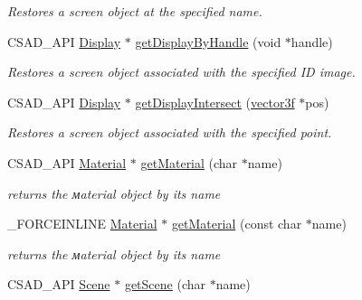 \begin{DoxyCompactItemize}
\begin{DoxyCompactList}\small\item\em Restores a screen object at the specified name. \end{DoxyCompactList}\item 
\hypertarget{classcsad_1_1_graph_a9b483cf1f8583362b672813375527e10}{C\-S\-A\-D\-\_\-\-A\-P\-I \hyperlink{classcsad_1_1_display}{Display} $\ast$ \hyperlink{classcsad_1_1_graph_a9b483cf1f8583362b672813375527e10}{get\-Display\-By\-Handle} (void $\ast$handle)}\label{classcsad_1_1_graph_a9b483cf1f8583362b672813375527e10}

\begin{DoxyCompactList}\small\item\em Restores a screen object associated with the specified I\-D image. \end{DoxyCompactList}\item 
\hypertarget{classcsad_1_1_graph_a6487e2fab26cf007688b3e990aa925a7}{C\-S\-A\-D\-\_\-\-A\-P\-I \hyperlink{classcsad_1_1_display}{Display} $\ast$ \hyperlink{classcsad_1_1_graph_a6487e2fab26cf007688b3e990aa925a7}{get\-Display\-Intersect} (\hyperlink{classbt_1_1vector3f}{vector3f} $\ast$pos)}\label{classcsad_1_1_graph_a6487e2fab26cf007688b3e990aa925a7}

\begin{DoxyCompactList}\small\item\em Restores a screen object associated with the specified point. \end{DoxyCompactList}\item 
\hypertarget{classcsad_1_1_graph_a34762d6962ec058d36d9f9dde42c9a37}{C\-S\-A\-D\-\_\-\-A\-P\-I \hyperlink{classcsad_1_1_material}{Material} $\ast$ \hyperlink{classcsad_1_1_graph_a34762d6962ec058d36d9f9dde42c9a37}{get\-Material} (char $\ast$name)}\label{classcsad_1_1_graph_a34762d6962ec058d36d9f9dde42c9a37}

\begin{DoxyCompactList}\small\item\em returns the мaterial object by its name \end{DoxyCompactList}\item 
\hypertarget{classcsad_1_1_graph_a4d0c84d3e29c452fffc84d2979c8b274}{\-\_\-\-F\-O\-R\-C\-E\-I\-N\-L\-I\-N\-E \hyperlink{classcsad_1_1_material}{Material} $\ast$ \hyperlink{classcsad_1_1_graph_a4d0c84d3e29c452fffc84d2979c8b274}{get\-Material} (const char $\ast$name)}\label{classcsad_1_1_graph_a4d0c84d3e29c452fffc84d2979c8b274}

\begin{DoxyCompactList}\small\item\em returns the мaterial object by its name \end{DoxyCompactList}\item 
\hypertarget{classcsad_1_1_graph_abaa187b0797ea4adfbdb10384f98c57c}{C\-S\-A\-D\-\_\-\-A\-P\-I \hyperlink{classcsad_1_1_scene}{Scene} $\ast$ \hyperlink{classcsad_1_1_graph_abaa187b0797ea4adfbdb10384f98c57c}{get\-Scene} (char $\ast$name)}\label{classcsad_1_1_graph_abaa187b0797ea4adfbdb10384f98c57c}


\end{DoxyCompactItemize}
